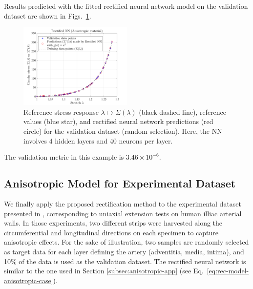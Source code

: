 Results predicted with the fitted rectified neural network model on the validation dataset are shown in Figs.~\ref{fig:ANI best result 1}.
\begin{figure}[ht!]
    \begin{center}
        \includegraphics[width=0.5\textwidth]{Pictures/sigma_ANI.png}
    \end{center}
    \caption[Reference stress response and values, rectified NN predictions.]{Reference stress response $\lambda \mapsto \Sigma(\lambda)$ (black dashed line), reference values (blue star), and rectified neural network predictions (red circle) for the validation dataset (random selection). Here, the NN involves 4 hidden layers and 40 neurons per layer.}
    \label{fig:ANI best result 1}
\end{figure}
The validation metric in this example is $3.46 \times 10^{-6}$.

\subsection{Anisotropic Model for Experimental Dataset}\label{subsec:exp-app}
We finally apply the proposed rectification method to the experimental dataset presented in \cite{holzapfel2005determination}, corresponding to uniaxial extension tests on human illiac arterial walls. In those experiments, two different strips were harvested along the circumferential and longitudinal directions on each specimen to capture anisotropic effects. For the sake of illustration, two samples are randomly selected as target data for each layer defining the artery (adventitia, media, intima), and 10\% of the data is used as the validation dataset. The rectified neural network is similar to the one used in Section \ref{subsec:anisotropic-app} (see Eq.~\eqref{eq:rec-model-anisotropic-case}). 

